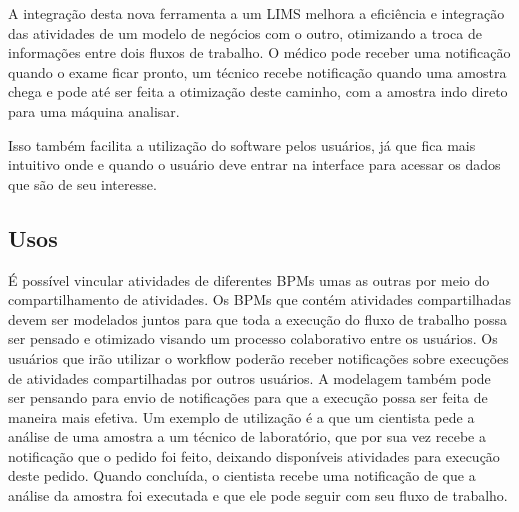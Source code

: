 
A integração desta nova ferramenta a um LIMS melhora a eficiência e integração das atividades de um modelo de negócios com o outro, otimizando a troca de informações entre dois fluxos de trabalho. O médico pode receber uma notificação quando o exame ficar pronto, um técnico recebe notificação quando uma amostra chega e pode até ser feita a otimização deste caminho, com a amostra indo direto para uma máquina analisar.

Isso também facilita a utilização do software pelos usuários, já que fica mais intuitivo onde e quando o usuário deve entrar na interface para acessar os dados que são de seu interesse.


\subsection{Usos}

É possível vincular atividades de diferentes BPMs umas as outras por meio do compartilhamento de atividades. Os BPMs que contém atividades compartilhadas devem ser modelados juntos para que toda a execução do fluxo de trabalho possa ser pensado e otimizado visando um processo colaborativo entre os usuários. Os usuários que irão utilizar o workflow poderão receber notificações sobre execuções de atividades compartilhadas por outros usuários. A modelagem também pode ser pensando para envio de notificações para que a execução possa ser feita de maneira mais efetiva. Um exemplo de utilização é a que um cientista pede a análise de uma amostra a um técnico de laboratório, que por sua vez recebe a notificação que o pedido foi feito, deixando disponíveis atividades para execução deste pedido. Quando concluída, o cientista recebe uma notificação de que a análise da amostra foi executada e que ele pode seguir com seu fluxo de trabalho.